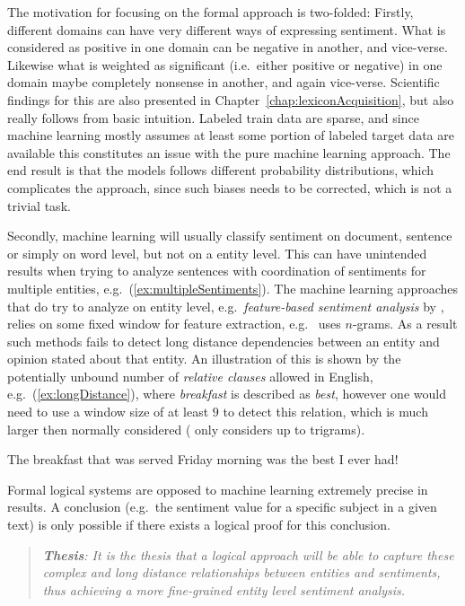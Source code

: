 The motivation for focusing on the formal approach is two-folded: Firstly, different domains can have very different ways of expressing sentiment. What is considered as positive in one domain can be negative in another, and vice-verse. Likewise what is weighted as significant (i.e.\ either positive or negative) in one domain maybe completely nonsense in another, and again vice-verse. Scientific findings for this are also presented in Chapter~\ref{chap:lexiconAcquisition}, but also really follows from basic intuition. Labeled train data are sparse, and since machine learning mostly assumes at least some portion of labeled target data are available this constitutes an issue with the pure machine learning approach. The end result is that the models follows different probability distributions, which complicates the approach, since such biases needs to be corrected, which is not a trivial task.

Secondly, machine learning will usually classify sentiment on document, sentence or simply on word level, but not on a entity level. This can have unintended results when trying to analyze sentences with coordination of sentiments for multiple entities, e.g.\ (\ref{ex:multipleSentiments}). The machine learning approaches that do try to analyze on entity level, e.g.\ \emph{feature-based sentiment analysis} by \citeauthor{webDataMining} , relies on some fixed window for feature extraction, e.g.\ \citeauthor{webDataMining}  uses $n$-grams. As a result such methods fails to detect long distance dependencies between an entity and opinion stated about that entity. An illustration of this is shown by the potentially unbound number of \emph{relative clauses} allowed in English, e.g.\ (\ref{ex:longDistance}), where \emph{breakfast} is described as \emph{best}, however one would need to use a window size of at least $9$ to detect this relation, which is much larger then normally considered (\citeauthor{webDataMining} only considers up to trigrams).
\begin{numquote}
	The breakfast that was served Friday morning was the best I ever had!
	\label{ex:longDistance}
\end{numquote}

Formal logical systems are opposed to machine learning extremely precise in results. A conclusion (e.g.\ the sentiment value for a specific subject in a given text) is only possible if there exists a logical proof for this conclusion. 

\begin{quote}
\it\textbf{Thesis}: It is the thesis that a logical approach will be able to capture these complex and long distance relationships between entities and sentiments, thus achieving a more fine-grained entity level sentiment analysis.
\end{quote}

